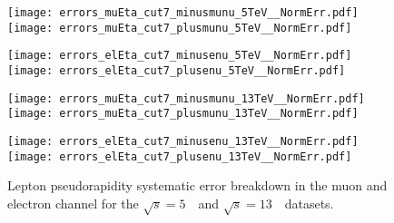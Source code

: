 \begin{figure}[h]
	\centering
	{\texttt{[image: errors\_muEta\_cut7\_minusmunu\_5TeV\_\_NormErr.pdf]}\label{f:}}
	{\texttt{[image: errors\_muEta\_cut7\_plusmunu\_5TeV\_\_NormErr.pdf]}\label{f:}}
	
	{\texttt{[image: errors\_elEta\_cut7\_minusenu\_5TeV\_\_NormErr.pdf]}\label{f:}}
	{\texttt{[image: errors\_elEta\_cut7\_plusenu\_5TeV\_\_NormErr.pdf]}\label{f:}}
	
		{\texttt{[image: errors\_muEta\_cut7\_minusmunu\_13TeV\_\_NormErr.pdf]}\label{f:}}
	{\texttt{[image: errors\_muEta\_cut7\_plusmunu\_13TeV\_\_NormErr.pdf]}\label{f:}}
	
	{\texttt{[image: errors\_elEta\_cut7\_minusenu\_13TeV\_\_NormErr.pdf]}\label{f:}}
	{\texttt{[image: errors\_elEta\_cut7\_plusenu\_13TeV\_\_NormErr.pdf]}\label{f:}}
	\caption{  Lepton pseudorapidity systematic error breakdown in the muon and electron channel  for the $\sqrt{s} = 5$~\TeV\ and $\sqrt{s} = 13$~\TeV\ datasets.}
\end{figure}
\newpage

